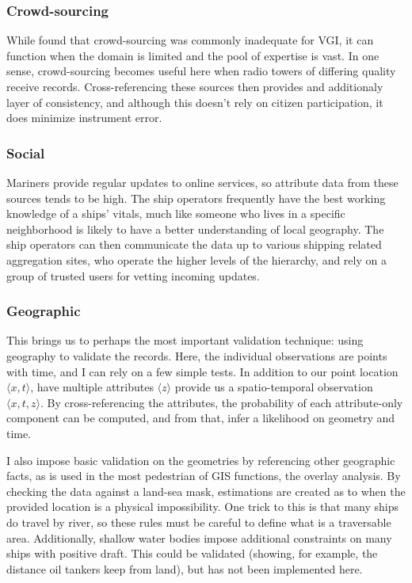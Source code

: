 \subsubsection{Crowd-sourcing}
While \cite{goodchildli2012} found that crowd-sourcing was commonly inadequate for VGI, it can function when the domain is limited and the pool of expertise is vast. In one sense, crowd-sourcing becomes useful here when radio towers of differing quality receive records. Cross-referencing these sources then provides and additionaly layer of consistency, and although this doesn't rely on citizen participation, it does minimize instrument error.

\subsubsection{Social}
Mariners provide regular updates to online services, so attribute data from these sources tends to be high. The ship operators frequently have the best working knowledge of a ships' vitals, much like someone who lives in a specific neighborhood is likely to have a better understanding of local geography. The ship operators can then communicate the data up to various shipping related aggregation sites, who operate the higher levels of the hierarchy, and rely on a group of trusted users for vetting incoming updates.

\subsubsection{Geographic}
This brings us to perhaps the most important validation technique: using geography to validate the records. Here, the individual observations are points with time, and I can rely on a few simple tests.  In addition to our point location $\langle x,t \rangle$, have multiple attributes $\langle z \rangle$ provide us a spatio-temporal observation $\langle x,t,z \rangle$. By cross-referencing the attributes, the probability of each attribute-only component can be computed, and from that, infer a likelihood on geometry and time.

I also impose basic validation on the geometries by referencing other geographic facts, as is used in the most pedestrian of GIS functions, the overlay analysis. By checking the data against a land-sea mask, estimations are created as to when the provided location is a physical impossibility. One trick to this is that many ships do travel by river, so these rules must be careful to define what is a traversable area. Additionally, shallow water bodies impose additional constraints on many ships with positive draft. This could be validated (showing, for example, the distance oil tankers keep from land), but has not been implemented here.

